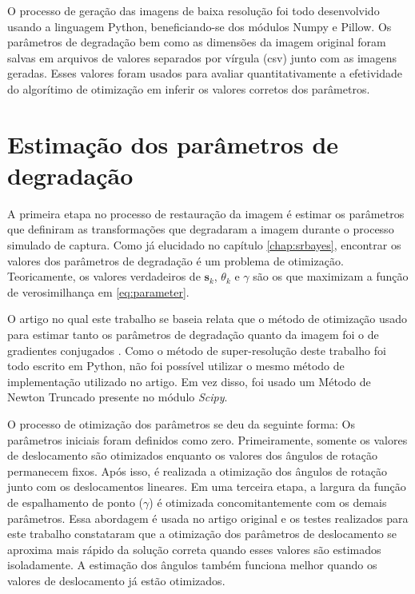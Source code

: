 O processo de geração das imagens de baixa resolução foi todo desenvolvido usando a linguagem Python,
beneficiando-se dos módulos Numpy e Pillow.
Os parâmetros de degradação bem como as dimensões da imagem original foram salvas em arquivos de valores separados por vírgula (csv) junto com as imagens geradas.
Esses valores foram usados para avaliar quantitativamente a efetividade do algorítimo de
otimização em inferir os valores corretos dos parâmetros.

\section{Estimação dos parâmetros de degradação}
\label{sec:parestimation}
A primeira etapa no processo de restauração da imagem é estimar os parâmetros que definiram as transformações que degradaram a imagem durante o processo simulado de captura. Como já elucidado no capítulo \ref{chap:srbayes}, encontrar os valores dos parâmetros de degradação é um problema de otimização.
Teoricamente, os valores verdadeiros de $\mathbf{s}_k$, $\theta_k$ e $\gamma$ são os que maximizam a função de verosimilhança em \ref{eq:parameter}.

O artigo no qual este trabalho se baseia relata que o método de otimização usado
para estimar tanto os parâmetros de degradação quanto da imagem foi o de gradientes
conjugados \cite{tipping2003bayesian}.
Como o método de super-resolução deste trabalho foi todo escrito em Python,
não foi possível utilizar o mesmo método de implementação utilizado no artigo.
Em vez disso, foi usado um Método de Newton Truncado presente no módulo \emph{Scipy}.


O processo de otimização dos parâmetros se deu da seguinte forma:
Os parâmetros iniciais foram definidos como zero.
Primeiramente, somente os valores de deslocamento são otimizados enquanto os valores dos ângulos de rotação permanecem fixos.
Após isso, é realizada a otimização dos ângulos de rotação junto com os deslocamentos lineares.
Em uma terceira etapa, a largura da função de espalhamento de ponto ($\gamma$) é otimizada
concomitantemente com os demais parâmetros.
Essa abordagem é usada no artigo original e os testes realizados para este trabalho
constataram que a otimização dos parâmetros de deslocamento se aproxima mais rápido da
solução correta quando esses valores são estimados isoladamente.
A estimação dos ângulos também funciona melhor quando os valores de deslocamento já estão
otimizados.


